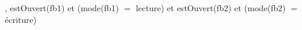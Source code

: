 \begin{algorithme}
{, }{estOuvert(fb1) et (mode(fb1) $=$ lecture) et estOuvert(fb2) et (mode(fb2) $=$ écriture)}
\end{algorithme}